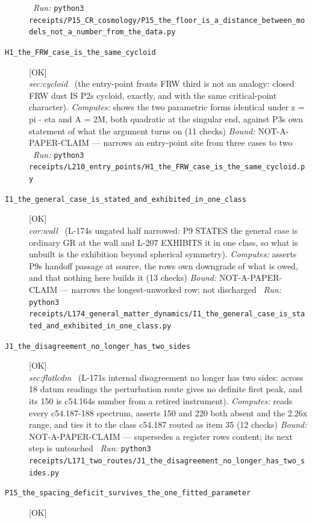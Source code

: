 \begin{description}
\ \emph{Run:} \texttt{python3 receipts/P15\_CR\_cosmology/P15\_the\_floor\_is\_a\_distance\_between\_models\_not\_a\_number\_from\_the\_data.py}
\item[\label{rcpt:H1_the_FRW_case_is_the_same_cycloid}\texttt{H1\_the\_FRW\_case\_is\_the\_same\_cycloid}]\hfill\textsf{[OK]}\\
\textit{sec:cycloid} \ (the entry-point fronts FRW third is not an analogy: closed FRW dust IS P2s cycloid, exactly, and with the same critical-point character). 
\emph{Computes:} shows the two parametric forms identical under z = pi - eta and A = 2M, both quadratic at the singular end, against P3s own statement of what the argument turns on (11 checks)
 \emph{Bound:} NOT-A-PAPER-CLAIM --- narrows an entry-point site from three cases to two
\ \emph{Run:} \texttt{python3 receipts/L210\_entry\_points/H1\_the\_FRW\_case\_is\_the\_same\_cycloid.py}
\item[\label{rcpt:I1_the_general_case_is_stated_and_exhibited_in_one_class}\texttt{I1\_the\_general\_case\_is\_stated\_and\_exhibited\_in\_one\_class}]\hfill\textsf{[OK]}\\
\textit{cor:wall} \ (L-174s ungated half narrowed: P9 STATES the general case is ordinary GR at the wall and L-207 EXHIBITS it in one class, so what is unbuilt is the exhibition beyond spherical symmetry). 
\emph{Computes:} asserts P9s handoff passage at source, the rows own downgrade of what is owed, and that nothing here builds it (13 checks)
 \emph{Bound:} NOT-A-PAPER-CLAIM --- narrows the longest-unworked row; not discharged
\ \emph{Run:} \texttt{python3 receipts/L174\_general\_matter\_dynamics/I1\_the\_general\_case\_is\_stated\_and\_exhibited\_in\_one\_class.py}
\item[\label{rcpt:J1_the_disagreement_no_longer_has_two_sides}\texttt{J1\_the\_disagreement\_no\_longer\_has\_two\_sides}]\hfill\textsf{[OK]}\\
\textit{sec:flatlcdm} \ (L-171s internal disagreement no longer has two sides: across 18 datum readings the perturbation route gives no definite first peak, and its 150 is c54.164s number from a retired instrument). 
\emph{Computes:} reads every c54.187-188 spectrum, asserts 150 and 220 both absent and the 2.26x range, and ties it to the class c54.187 routed as item 35 (12 checks)
 \emph{Bound:} NOT-A-PAPER-CLAIM --- supersedes a register rows content; its next step is untouched
\ \emph{Run:} \texttt{python3 receipts/L171\_two\_routes/J1\_the\_disagreement\_no\_longer\_has\_two\_sides.py}
\item[\label{rcpt:P15_the_spacing_deficit_survives_the_one_fitted_parameter}\texttt{P15\_the\_spacing\_deficit\_survives\_the\_one\_fitted\_parameter}]\hfill\textsf{[OK]}\\

\end{description}
